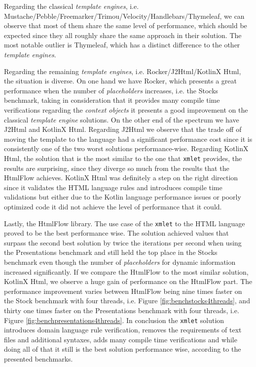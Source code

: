 \noindent
Regarding the classical \textit{template engines}, i.e. Mustache/Pebble/Freemarker/Trimou/Velocity/Handlebars/Thymeleaf, we can observe that most of them share the same level of performance, which should be expected since they all roughly share the same approach in their solution. The most notable outlier is Thymeleaf, which has a distinct difference to the other \textit{template engines}.

\noindent
Regarding the remaining \textit{template engines}, i.e. Rocker/J2Html/KotlinX Html, the situation is diverse. On one hand we have Rocker, which presents a great performance when the number of \textit{placeholders} increases, i.e. the Stocks benchmark, taking in consideration that it provides many compile time verifications regarding the \textit{context objects} it presents a good improvement on the classical \textit{template engine} solutions. On the other end of the spectrum we have J2Html and KotlinX Html. Regarding J2Html we observe that the trade off of moving the template to the language had a significant performance cost since it is consistently one of the two worst solutions performance-wise. Regarding KotlinX Html, the solution that is the most similar to the one that \texttt{xmlet} provides, the results are surprising, since they diverge so much from the results that the HtmlFlow achieves. KotlinX Html was definitely a step on the right direction since it validates the \ac{HTML} language rules and introduces compile time validations but either due to the Kotlin language performance issues or poorly optimized code it did not achieve the level of performance that it could.

\noindent
Lastly, the HtmlFlow library. The use case of the \texttt{xmlet} to the \ac{HTML} language proved to be the best performance wise. The solution achieved values that surpass the second best solution by twice the iterations per second when using the Presentations benchmark and still held the top place in the Stocks benchmark even though the number of \textit{placeholders} for dynamic information increased significantly. If we compare the HtmlFlow to the most similar solution, KotlinX Html, we observe a huge gain of performance on the HtmlFlow part. The performance improvement varies between HtmlFlow being nine times faster on the Stock benchmark with four threads, i.e. Figure \ref{fig:benchstocks4threads}, and thirty one times faster on the Presentations benchmark with four threads, i.e. Figure \ref{fig:benchpresentations4threads}. In conclusion the \texttt{xmlet} solution introduces domain language rule verification, removes the requirements of text files and additional syntaxes, adds many compile time verifications and while doing all of that it still is the best solution performance wise, according to the presented benchmarks.